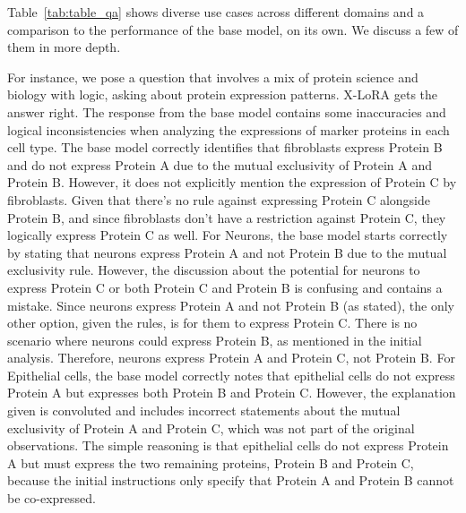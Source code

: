 \documentclass{article}
\begin{document}
Table~\ref{tab:table_qa} shows diverse use cases across different domains and a comparison to the performance of the base model, on its own. We discuss a few of them in more depth.

For instance, we pose a question that involves a mix of protein science and biology with logic, asking about protein expression patterns. X-LoRA gets the answer right. The  response from the base model contains some inaccuracies and logical inconsistencies when analyzing the expressions of marker proteins in each cell type. The base model correctly identifies that fibroblasts express Protein B and do not express Protein A due to the mutual exclusivity of Protein A and Protein B. However, it does not explicitly mention the expression of Protein C by fibroblasts. Given that there's no rule against expressing Protein C alongside Protein B, and since fibroblasts don't have a restriction against Protein C, they logically express Protein C as well. For Neurons, the base model starts correctly by stating that neurons express Protein A and not Protein B due to the mutual exclusivity rule. However, the discussion about the potential for neurons to express Protein C or both Protein C and Protein B is confusing and contains a mistake. Since neurons express Protein A and not Protein B (as stated), the only other option, given the rules, is for them to express Protein C. There is no scenario where neurons could express Protein B, as mentioned in the initial analysis. Therefore, neurons express Protein A and Protein C, not Protein B. For Epithelial cells, the base model correctly notes that epithelial cells do not express Protein A but expresses both Protein B and Protein C. However, the explanation given is convoluted and includes incorrect statements about the mutual exclusivity of Protein A and Protein C, which was not part of the original observations. The simple reasoning is that epithelial cells do not express Protein A but must express the two remaining proteins, Protein B and Protein C, because the initial instructions only specify that Protein A and Protein B cannot be co-expressed. 
%
\end{document}
